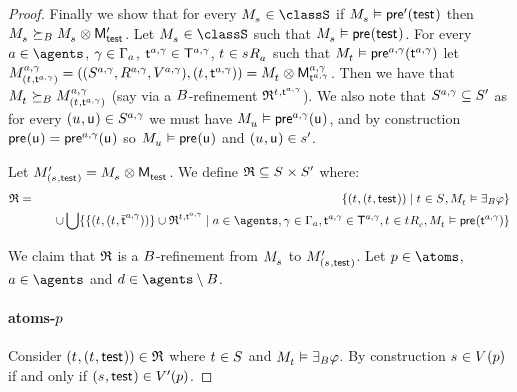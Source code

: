 \begin{proof}
Finally we show that for every $\kPModel{\kStateS} \in \classS$ if $\kPModel{\kStateS} \entails \aPreconditionP(\aStateTest)$ then $\kPModel{\kStateS} \simulatesBs \kPModel{\kStateS} \exec \aPModelP{\aStateTest}$.
Let $\kPModel{\kStateS} \in \classS$ such that $\kPModel{\kStateS} \entails \aPrecondition(\aStateTest)$.
For every $\agentA \in \agents$, $\gamma \in \Gamma_\agentA$, $\aStateT[\agentA, \gamma] \in \aStatesT[\agentA, \gamma]$, $\kStateT \in \kSuccessorsA{\kStateS}$ such that $\kPModel{\kStateT} \entails \aPrecondition[\agentA, \gamma](\aStateT[\agentA, \gamma])$ let $\kPModelAndTuple[\agentA, \gamma]{(\kStateT, \aStateT[\agentA, \gamma])} = \kPModel{\kStateT} \exec \aPModel[\agentA, \gamma]{\aStateT[\agentA, \gamma]}$.
Then we have that $\kPModel{\kStateT} \simulatesBs \kPModel[\agentA, \gamma]{(\kStateT, \aStateT[\agentA, \gamma])}$ (say via a $\agentsB$-refinement $\refinement^{\kStateT, \aStateT[\agentA, \gamma]}$).
We also note that $\kStates[\agentA, \gamma] \subseteq \kStatesP$ as for every $(\kStateU, \aStateU) \in \kStates[\agentA, \gamma]$ we must have $\kPModel{\kStateU} \entails \aPrecondition[\agentA, \gamma](\aStateU)$, and by construction $\aPrecondition(\aStateU) = \aPrecondition[\agentA, \gamma](\aStateU)$ so $\kPModel{\kStateU} \entails \aPrecondition(\aStateU)$ and $(\kStateU, \aStateU) \in \kStateSP$.

Let $\kPModelP{(\kStateS, \aStateTest)} = \kPModel{\kStateS} \exec \aPModel{\aStateTest}$.
We define $\refinement \subseteq \kStates \times \kStatesP$ where:
\begin{eqnarray*}
\refinement &=& 
    \{(\kStateT, (\kStateT, \aStateTest)) \mid \kStateT \in \kStates, \kPModel{\kStateT} \entails \someactsBs \phi \} \\&&\quad \cup 
\bigcup \{\{(\kStateT, (\kStateT, \aPStateT[\agentA, \gamma]))\} \cup \refinement^{\kStateT, \aStateT[\agentA, \gamma]} \mid \agentA \in \agents, \gamma \in \Gamma_\agentA, \aStateT[\agentA, \gamma] \in \aStatesT[\agentA, \gamma], \kStateT \in \kSuccessorsC{\kStateT}, \kPModel{\kStateT} \entails \aPrecondition(\aStateT[\agentA, \gamma])\}
\end{eqnarray*}

We claim that $\refinement$ is a $\agentsB$-refinement from $\kPModel{\kStateS}$ to $\kPModelP{(\kStateS, \aStateTest)}$.
Let $\atomP \in \atoms$, $\agentA \in \agents$ and $\agentD \in \agents \setminus \agentsB$.

\paragraph{atoms-$\atomP$}
Consider $(\kStateT, (\kStateT, \aStateTest)) \in \refinement$ where $\kStateT \in \kStates$ and $\kPModel{\kStateT} \entails \someactsBs \phi$.
By construction $\kStateS \in \kValuation(\atomP)$ if and only if $(\kStateS, \aStateTest) \in \kValuationP(\atomP)$.


\end{proof}
